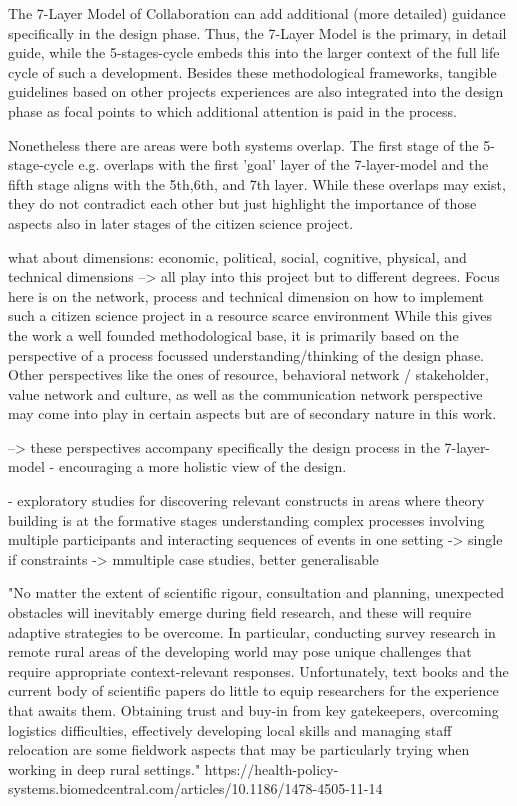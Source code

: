 The 7-Layer Model of Collaboration can add additional (more detailed) guidance specifically in the design phase. Thus, the 7-Layer Model is the primary, in detail guide, while the 5-stages-cycle embeds this into the larger context of the full life cycle of such a development.
Besides these methodological frameworks, tangible guidelines based on other projects experiences are also integrated into the design phase as focal points to which additional attention is paid in the process.

Nonetheless there are areas were both systems overlap. The first stage of the 5-stage-cycle e.g. overlaps with the first 'goal' layer of the 7-layer-model and the fifth stage aligns with the 5th,6th, and 7th layer. While these overlaps may exist, they do not contradict each other but just highlight the importance of those aspects also in later stages of the citizen science project.

what about dimensions: economic, political, social, cognitive, physical, and technical dimensions
--> all play into this project but to different degrees. Focus here is on the network, process and technical dimension on how to implement such a citizen science project in a resource scarce environment
While this gives the work a well founded methodological base, it is primarily based on the perspective of a process focussed understanding/thinking of the design phase. Other perspectives like the ones of resource, behavioral network / stakeholder, value network and culture, as well as the communication network perspective may come into play in certain aspects but are of secondary nature in this work.

--> these perspectives accompany specifically the design process in the 7-layer-model - encouraging a more holistic view of the design.




- exploratory studies for discovering relevant constructs in areas where theory building is at the formative stages
understanding complex processes involving multiple participants and interacting sequences of events in one setting
-> single if constraints -> mmultiple case studies, better generalisable


"No matter the extent of scientific rigour, consultation and planning, unexpected obstacles will inevitably emerge during field research, and these will require adaptive strategies to be overcome. In particular, conducting survey research in remote rural areas of the developing world may pose unique challenges that require appropriate context-relevant responses. Unfortunately, text books and the current body of scientific papers do little to equip researchers for the experience that awaits them. Obtaining trust and buy-in from key gatekeepers, overcoming logistics difficulties, effectively developing local skills and managing staff relocation are some fieldwork aspects that may be particularly trying when working in deep rural settings."
https://health-policy-systems.biomedcentral.com/articles/10.1186/1478-4505-11-14

